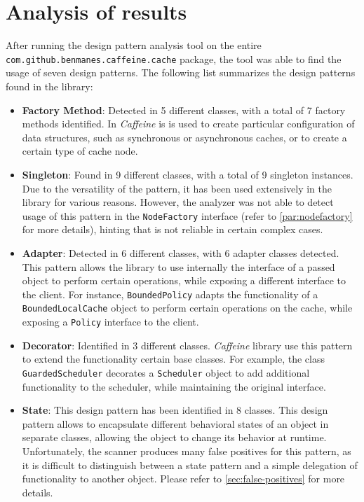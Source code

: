 \section{Analysis of results}

After running the design pattern analysis tool on the entire \texttt{com.github.benmanes.caffeine.cache} package, the tool was able to find the usage of seven design patterns. The following list summarizes the design patterns found in the library:

\begin{itemize}
	\item \textbf{Factory Method}: Detected in 5 different classes, with a total of 7 factory methods identified. In \textit{Caffeine} is is used to create particular configuration of data structures, such as synchronous or asynchronous caches, or to create a certain type of cache node.

	\item \textbf{Singleton}: Found in 9 different classes, with a total of 9 singleton instances. Due to the versatility of the pattern, it has been used extensively in the library for various reasons. However, the analyzer was not able to detect usage of this pattern in the \texttt{NodeFactory} interface (refer to \autoref{par:nodefactory} for more details), hinting that is not reliable in certain complex cases.

	\item \textbf{Adapter}: Detected in 6 different classes, with 6 adapter classes detected. This pattern allows the library to use internally the interface of a passed object to perform certain operations, while exposing a different interface to the client. For instance, \texttt{BoundedPolicy} adapts the functionality of a \texttt{BoundedLocalCache} object to perform certain operations on the cache, while exposing a \texttt{Policy} interface to the client.

	\item \textbf{Decorator}: Identified in 3 different classes. \textit{Caffeine} library use this pattern to extend the functionality certain base classes. For example, the class \texttt{GuardedScheduler} decorates a \texttt{Scheduler} object to add additional functionality to the scheduler, while maintaining the original interface.

	\item \textbf{State}: This design pattern has been identified in 8 classes. This design pattern allows to encapsulate different behavioral states of an object in separate classes, allowing the object to change its behavior at runtime. Unfortunately, the scanner produces many false positives for this pattern, as it is difficult to distinguish between a state pattern and a simple delegation of functionality to another object. Please refer to \autoref{sec:false-positives} for more details.


\end{itemize}
